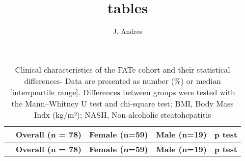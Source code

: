 \documentclass[
  letterpaper,
  DIV=11,
  numbers=noendperiod]{scrartcl}
\title{tables}
\author{J. Andres}
\date{}
\begin{document}
\maketitle


\begin{longtable}[]{@{}
  >{\raggedright\arraybackslash}p{}
  >{\centering\arraybackslash}p{}
  >{\centering\arraybackslash}p{}
  >{\centering\arraybackslash}p{}
  >{\centering\arraybackslash}p{}@{}}
\caption{Clinical characteristics of the FATe cohort and their
statistical differences- Data are presented as number (\%) or median
{[}interquartile range{]}. Differences between groups were tested with
the Mann--Whitney U test and chi-square test; BMI, Body Mass Indx
(kg/m²); NASH, Non-alcoholic steatohepatitis}\tabularnewline
\toprule\noalign{}
\begin{minipage}[b]{\linewidth}\raggedright
\end{minipage} & \begin{minipage}[b]{\linewidth}\centering
\textbf{Overall (n = 78)}
\end{minipage} & \begin{minipage}[b]{\linewidth}\centering
\textbf{Female (n=59)}
\end{minipage} & \begin{minipage}[b]{\linewidth}\centering
\textbf{Male (n=19)}
\end{minipage} & \begin{minipage}[b]{\linewidth}\centering
\textbf{p test}
\end{minipage} \\
\midrule\noalign{}
\endfirsthead
\toprule\noalign{}
\begin{minipage}[b]{\linewidth}\raggedright
\end{minipage} & \begin{minipage}[b]{\linewidth}\centering
\textbf{Overall (n = 78)}
\end{minipage} & \begin{minipage}[b]{\linewidth}\centering
\textbf{Female (n=59)}
\end{minipage} & \begin{minipage}[b]{\linewidth}\centering
\textbf{Male (n=19)}
\end{minipage} & \begin{minipage}[b]{\linewidth}\centering
\textbf{p test}

\end{minipage}
\end{longtable}
\end{document}
